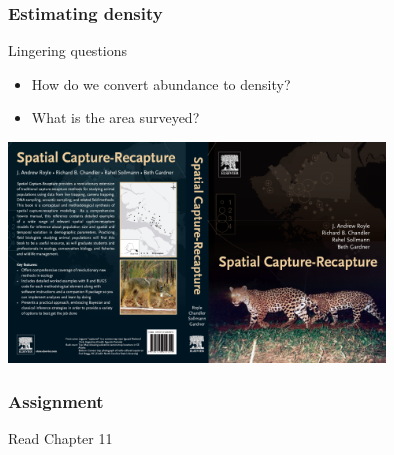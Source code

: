 \documentclass[color=usenames,dvipsnames]{beamer}\usepackage[]{graphicx}\usepackage[]{xcolor}
\begin{document}
\begin{frame}
  \frametitle{Estimating density}
  \large
  {%
    Lingering questions}
  \begin{itemize}
    \item How do we convert abundance to density?
    \item What is the area surveyed?
  \end{itemize}
  \pause
  \begin{center}
    \includegraphics[width=0.75\textwidth]{figs/scrbook}
  \end{center}
\end{frame}




\begin{frame}
  \frametitle{Assignment}
  \centering
  \huge
  Read Chapter 11 \\
\end{frame}
\end{document}
